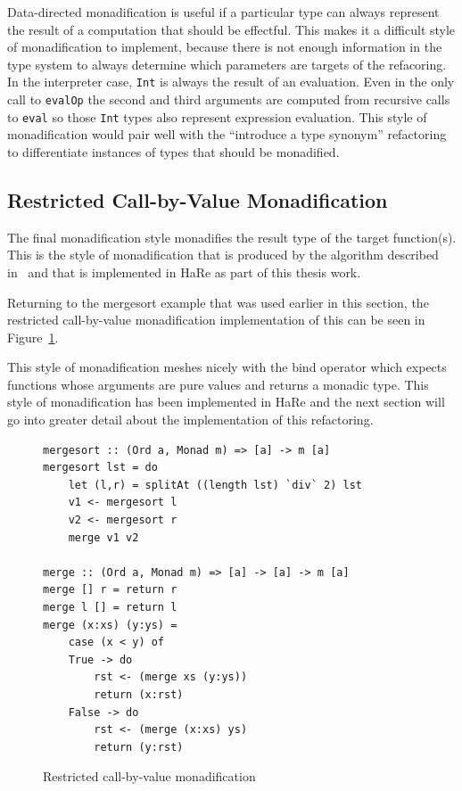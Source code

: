 Data-directed monadification is useful if a particular type can always represent the result of a computation that should be effectful. This makes it a difficult style of monadification to implement, because there is not enough information in the type system to always determine which parameters are targets of the refacoring. In the interpreter case, \texttt{Int} is always the result of an evaluation. Even in the only call to \texttt{evalOp} the second and third arguments are computed from recursive calls to \texttt{eval} so those \texttt{Int} types also represent expression evaluation. This style of monadification would pair well with the ``introduce a type synonym'' refactoring to differentiate instances of types that should be monadified. 

\subsection{Restricted Call-by-Value Monadification}

The final monadification style monadifies the result type of the target function(s). This is the style of monadification that is produced by the algorithm described in~\cite{monadification} and that is implemented in HaRe as part of this thesis work.

Returning to the mergesort example that was used earlier in this section, the restricted call-by-value monadification implementation of this can be seen in Figure~\ref{rCBV}.

This style of monadification meshes nicely with the bind operator which expects functions whose arguments are pure values and returns a monadic type. This style of monadification has been implemented in HaRe and the next section will go into greater detail about the implementation of this refactoring.

\begin{figure}[t]
\begin{lstlisting}
mergesort :: (Ord a, Monad m) => [a] -> m [a]
mergesort lst = do
	let (l,r) = splitAt ((length lst) `div` 2) lst
	v1 <- mergesort l
	v2 <- mergesort r
	merge v1 v2
	
merge :: (Ord a, Monad m) => [a] -> [a] -> m [a]
merge [] r = return r
merge l [] = return l
merge (x:xs) (y:ys) = 
	case (x < y) of
	True -> do 
		rst <- (merge xs (y:ys)) 
		return (x:rst)
	False -> do
		rst <- (merge (x:xs) ys)	
	 	return (y:rst)
\end{lstlisting}
\caption{Restricted call-by-value monadification}
\label{rCBV}
\end{figure}

